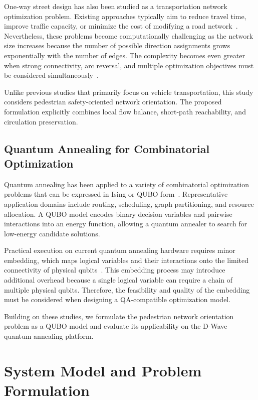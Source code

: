 \documentclass[twocolumn,a4paper]{article} %
\begin{document}
One-way street design has also been studied as a transportation network optimization problem. 
Existing approaches typically aim to reduce travel time, improve traffic capacity, or minimize the cost of modifying a road network~\cite{drezner1997selecting, huang2020bi, huang2020model}. 
Nevertheless, these problems become computationally challenging as the network size increases because the number of possible direction assignments grows exponentially with the number of edges. 
The complexity becomes even greater when strong connectivity, arc reversal, and multiple optimization objectives must be considered simultaneously~\cite{burkard1999minimum, bangjensen2023complexity}. 

Unlike previous studies that primarily focus on vehicle transportation, this study considers pedestrian safety-oriented network orientation. 
The proposed formulation explicitly combines local flow balance, short-path reachability, and circulation preservation.

\subsection{Quantum Annealing for Combinatorial Optimization}
\label{subsec:related_qa}

Quantum annealing has been applied to a variety of combinatorial optimization problems that can be expressed in Ising or QUBO form~\cite{qa_for_optimize}. 
Representative application domains include routing, scheduling, graph partitioning, and resource allocation. 
A QUBO model encodes binary decision variables and pairwise interactions into an energy function, allowing a quantum annealer to search for low-energy candidate solutions.

Practical execution on current quantum annealing hardware requires minor embedding, which maps logical variables and their interactions onto the limited connectivity of physical qubits~\cite{minor_embedding_inQA2, minor_embedding_inQA}. 
This embedding process may introduce additional overhead because a single logical variable can require a chain of multiple physical qubits. 
Therefore, the feasibility and quality of the embedding must be considered when designing a QA-compatible optimization model.

Building on these studies, we formulate the pedestrian network orientation problem as a QUBO model and evaluate its applicability on the D-Wave quantum annealing platform.

\section{System Model and Problem Formulation} \label{sec:model}
\end{document}
